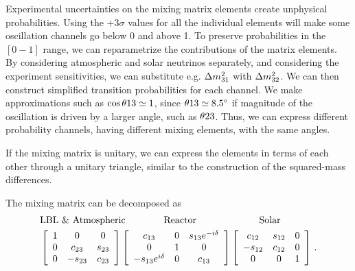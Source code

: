\documentclass[twocolumn]{article}
\begin{document}
Experimental uncertainties on the mixing matrix elements create unphysical probabilities. Using the $+3\sigma$ values for all the individual elements will make some oscillation channels go below 0 and above 1. To preserve probabilities in the $[0-1]$ range, we can reparametrize the contributions of the matrix elements. By considering atmospheric and solar neutrinos separately, and considering the experiment sensitivities, we can substitute e.g. $\dm[31]$ with $\dm[32]$. We can then construct simplified transition probabilities for each channel. We make approximations such as $\cos{\th{13}} \simeq 1$, since $\th{13} \simeq 8.5 ^\circ$ if magnitude of the oscillation is driven by a larger angle, such as $\th{23}$. Thus, we can express different probability channels, having different mixing elements, with the same angles. 

If the mixing matrix is unitary, we can express the elements in terms of each other through a unitary triangle, similar to the construction of the squared-mass differences.

The mixing matrix can be decomposed as 
\begin{align*}
  &\text{{LBL \& Atmospheric}} \hspace{1.4 cm} \text{{Reactor}} \hspace{2.3 cm} \text{{Solar}} \\
  &\left[\begin{array}{ccc}
1 & 0 & 0 \\
0 & c_{23} & s_{23} \\
0 & -s_{23} & c_{23}
\end{array}\right]\left[\begin{array}{ccc}
c_{13} & 0 & s_{13} e^{-i \delta} \\
0 & 1 & 0 \\
-s_{13} e^{i \delta} & 0 & c_{13}
\end{array}\right]\left[\begin{array}{ccc}
c_{12} & s_{12} & 0 \\
-s_{12} & c_{12} & 0 \\
0 & 0 & 1
\end{array}\right]
\,.\end{align*}
\end{document}
